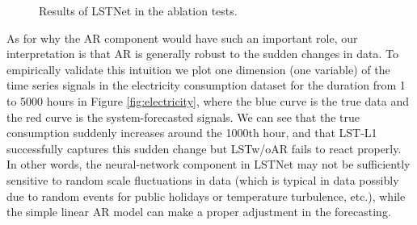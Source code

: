 \begin{figure}[!ht]
  \caption{Results of LSTNet in the ablation tests.}
  \label{fig:ablation}
\end{figure}


\iffalse
As for why the AR component would have such an important role, our interpretation is that AR is generally robust to the sudden changes in data. To empirically validate this intuition we plot one dimension (one variable) of the time series signals in the electricity consumption dataset for the duration from 1 to 5000 hours in Figure \ref{fig:electricity}, where the blue curve is the true data and the red curve is the system-forecasted signals. We can see that the true consumption suddenly increases around the 1000th hour, and that LST-L1 successfully captures this sudden change but LSTw/oAR fails to react properly.  In other words, the neural-network component in LSTNet may not be sufficiently sensitive to random scale fluctuations in data (which is typical in \electricity data possibly due to random events for public holidays or temperature turbulence, etc.), while the simple linear AR model can make a proper adjustment in the forecasting.

